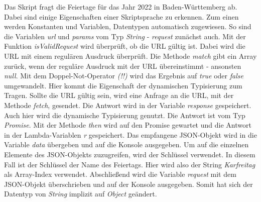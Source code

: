Das Skript fragt die Feiertage für das Jahr 2022 in Baden-Württemberg ab.
Dabei sind einige Eigenschaften einer Skriptsprache zu erkennen.
Zum einen werden Konstanten und Variablen, Datentypen automatisch zugewiesen.
So sind die Variablen \textit{url} und \textit{params} vom Typ \textit{String} - \textit{request} zunächst auch.
Mit der Funktion \textit{isValidRequest} wird überprüft, ob die URL gültig ist.
Dabei wird die URL mit einem regulären Ausdruck überprüft.
Die Methode \textit{match} gibt ein Array zurück, wenn der reguläre Ausdruck mit der URL übereinstimmt - ansonsten \textit{null}.
Mit dem Doppel-Not-Operator \textit{(!!)} wird das Ergebnis auf \textit{true} oder \textit{false} umgewandelt.
Hier kommt die Eigenschaft der dynamischen Typisierung zum Tragen.
\newline
Sollte die URL gültig sein, wird eine Anfrage an die URL, mit der Methode \textit{fetch}, gesendet.
Die Antwort wird in der Variable \textit{response} gespeichert. Auch hier wird die dynamische Typisierung genutzt.
Die Antwort ist vom Typ \textit{Promise}.
Mit der Methode \textit{then} wird auf den Promise gewartet und die Antwort in der Lambda-Variablen \textit{r} gespeichert.
Das empfangene JSON-Objekt wird in die Variable \textit{data} übergeben und auf die Konsole ausgegeben.
Um auf die einzelnen Elemente des JSON-Objekts zuzugreifen, wird der Schlüssel verwendet.
In diesem Fall ist der Schlüssel der Name des Feiertags.
Hier wird also der String \textit{Karfreitag} als Array-Index verwendet.
Abschließend wird die Variable \textit{request} mit dem JSON-Objekt überschrieben und auf der Konsole ausgegeben.
Somit hat sich der Datentyp von \textit{String} implizit auf \textit{Object} geändert.

\newline
